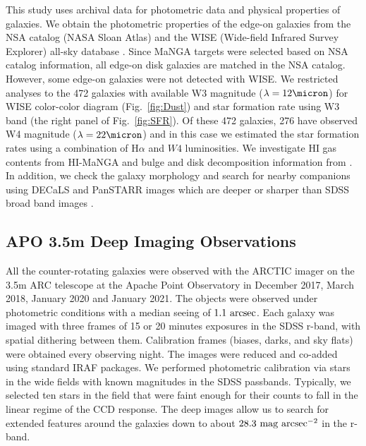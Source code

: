 \documentclass[fleqn,usenatbib]{mnras}
\begin{document}
This study uses archival data for photometric data and physical properties of galaxies.
We obtain the photometric properties of the edge-on galaxies 
from the NSA catalog (NASA Sloan Atlas) and 
the WISE (Wide-field Infrared Survey Explorer) all-sky database \citep{NSA,WISE}.
Since MaNGA targets were selected based on NSA catalog information,
all edge-on disk galaxies are matched in the NSA catalog.
However, some edge-on galaxies were not detected with WISE.
We restricted analyses to the 472 galaxies with available W3 magnitude ($\rm \lambda =12 \micron$) for WISE color-color diagram (Fig.~\ref{fig:Dust}) 
and star formation rate using W3 band (the right panel of Fig.~\ref{fig:SFR}).   
Of these 472 galaxies, 276 have observed W4 magnitude ($\rm \lambda = 22 \micron$) and in this case we estimated the
star formation rates using a combination of H$\alpha$ and $W4$ luminosities.
We investigate HI gas contents from HI-MaNGA \citet{Masters2019,Stark2021} and
bulge and disk decomposition information from \citet{Simard2011}.
In addition, we check the galaxy morphology and search for nearby companions 
using DECaLS and PanSTARR images which are deeper or sharper than SDSS broad band images \citep{PanSTARR, DeCALS}.

\subsection{APO 3.5m Deep Imaging Observations} 
\label{sec:apo35}
All the counter-rotating galaxies were observed 
with the ARCTIC imager on the 3.5m ARC telescope at the
Apache Point Observatory in December 2017, March 2018, January 2020 and January 2021. 
The objects were observed under photometric
conditions with a median seeing of $\rm 1.1~arcsec$.
Each galaxy was imaged with three frames of 15 or 20 minutes exposures
in the SDSS r-band, with spatial dithering between them.
Calibration frames (biases, darks, and sky flats)
were obtained every observing night.
The images were reduced and co-added using standard IRAF packages.
We performed photometric calibration via stars in the wide
fields with known magnitudes in the SDSS passbands. Typically,
we selected ten stars in the field that were faint enough for their counts to fall in the linear regime of the CCD response.
The deep images allow us to search for extended features around the 
galaxies down to about $\rm 28.3~mag~arcsec^{-2}$ in the r-band.
\end{document}
